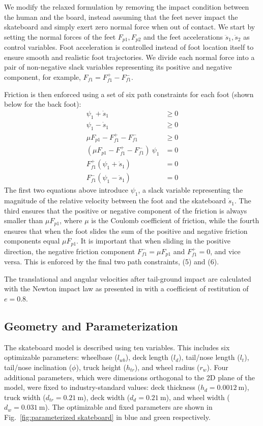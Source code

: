 \documentclass[default,iicol]{sn-jnl}
\begin{document}
We modify the relaxed formulation by removing the impact condition between the human and the board, instead assuming that the feet never impact the skateboard and simply exert zero normal force when out of contact.
We start by setting the normal forces of the feet $F_{p1}, F_{p2}$ and the feet accelerations $\ddot{s}_1, \ddot{s}_2$ as control variables.
Foot acceleration is controlled instead of foot location itself to ensure smooth and realistic foot trajectories.
We divide each normal force into a pair of non-negative slack variables representing its positive and negative component, for example, $F_{f1} = F_{f1}^+ - F_{f1}^-$.

Friction is then enforced using a set of six path constraints for each foot (shown below for the back foot):
\begin{align} \label{e_frictioncontrol}
    \psi_1 + \dot s_1  &\geq 0 \\
    \psi_1 - \dot s_1  &\geq 0 \\
    \mu F_{p1} - F_{f1}^+ - F_{f1}^- &\geq 0 \\
    (\mu F_{p1} - F_{f1}^+ - F_{f1}^-)\ \psi_1  &= 0 \\
    F_{f1}^+ (\psi_1 + \dot s_1)  &= 0 \\
    F_{f1}^- (\psi_1 - \dot s_1)  &= 0
\end{align}
The first two equations above introduce $\psi_1$, a slack variable representing the magnitude of the relative velocity between the foot and the skateboard $\dot{s}_1$. The third ensures that the positive or negative component of the friction is always smaller than $\mu F_{p1}$, where $\mu$ is the Coulomb coefficient of friction, while the fourth ensures that when the foot slides the sum of the positive and negative friction components equal $\mu F_{p1}$. It is important that when sliding in the positive direction, the negative friction component $F_{f1}^- = \mu F_{p1}$ and $F_{f1}^+=0$, and vice versa. This is enforced by the final two path constraints, (5) and (6).

The translational and angular velocities after tail-ground impact are calculated with the Newton impact law as presented in \citet{vallery_heike_advanced_2018} with a coefficient of restitution of $e=0.8$.

\subsection{Geometry and Parameterization}\label{s_paropt}
The skateboard model is described using ten variables. This includes six optimizable parameters: wheelbase ($l_{wb}$), deck length ($l_{d}$), tail/nose length ($l_{t}$), tail/nose inclination ($\phi$), truck height ($h_{tr}$), and wheel radius ($r_w$). Four additional parameters, which were dimensions orthogonal to the 2D plane of the model, were fixed to industry-standard values: deck thickness ($h_d = \SI{0.0012}{\meter}$), truck width ($d_{tr} = \SI{0.21}{\meter}$), deck width ($d_d = \SI{0.21}{\meter}$), and wheel width ($d_w = \SI{0.031}{\meter}$). The optimizable and fixed parameters are shown in Fig.~\ref{fig:parameterized skateboard} in blue and green respectively.
\end{document}
